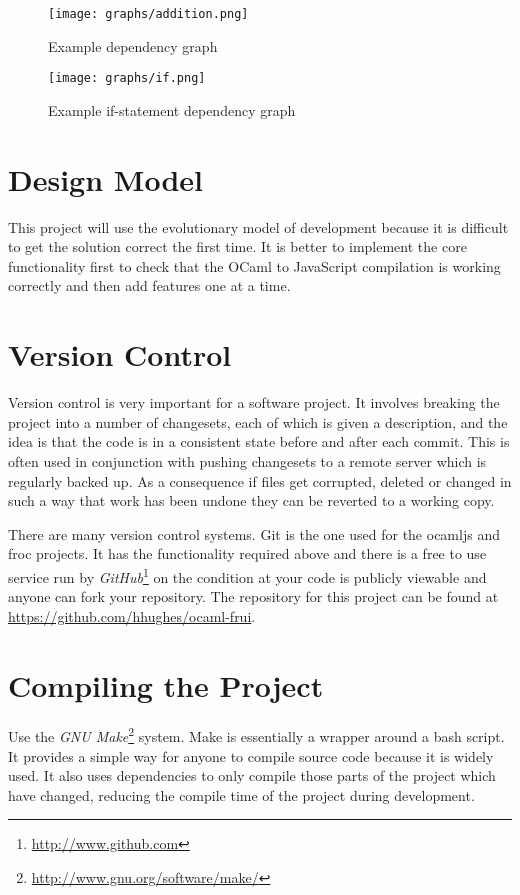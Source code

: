 \begin{figure}
  \centering
  \texttt{[image: graphs/addition.png]}
  \caption{Example dependency graph}
  \label{add_graph}
\end{figure}

\begin{figure}
  \centering
  \texttt{[image: graphs/if.png]}
  \caption{Example if-statement dependency graph}
  \label{if_graph}
\end{figure}

\section{Design Model}
This project will use the evolutionary model of development because it is difficult to get the solution correct the first time. It is better to implement the core functionality first to check that the OCaml to JavaScript compilation is working correctly and then add features one at a time.

\section{Version Control}
Version control is very important for a software project. It involves breaking the project into a number of changesets, each of which is given a description, and the idea is that the code is in a consistent state before and after each commit. This is often used in conjunction with pushing changesets to a remote server which is regularly backed up. As a consequence if files get corrupted, deleted or changed in such a way that work has been undone they can be reverted to a working copy.

There are many version control systems. Git is the one used for the ocamljs and froc projects. It has the functionality required above and there is a free to use service run by \emph{GitHub}\footnote{\url{http://www.github.com}} on the condition at your code is publicly viewable and anyone can fork your repository. The repository for this project can be found at \url{https://github.com/hhughes/ocaml-frui}.

\section{Compiling the Project}
Use the \emph{GNU Make}\footnote{\url{http://www.gnu.org/software/make/}} system. Make is essentially a wrapper around a bash script. It provides a simple way for anyone to compile source code because it is widely used. It also uses dependencies to only compile those parts of the project which have changed, reducing the compile time of the project during development.

